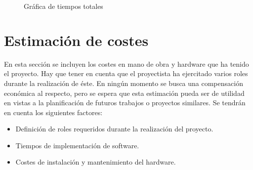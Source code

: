 \begin{figure}[!hb]
        \centering
        \caption{Gráfica de tiempos totales}
        \label{fig:total_times}
\end{figure}

\clearpage

\label{sec:cost_estimation}
\section{Estimación de costes}
En esta sección se incluyen los costes en mano de obra y hardware que ha tenido el proyecto. Hay que tener en cuenta que el proyectista ha ejercitado varios roles durante la realización de éste. En ningún momento se busca una compensación económica al respecto, pero se espera que esta estimación pueda ser de utilidad en vistas a la planificación de futuros trabajos o proyectos similares.
Se tendrán en cuenta los siguientes factores:
\begin{itemize}
	\item{Definición de roles requeridos durante la realización del proyecto.}
	\item{Tiempos de implementación de software.}
	\item{Costes de instalación y mantenimiento del hardware.}
\end{itemize}

